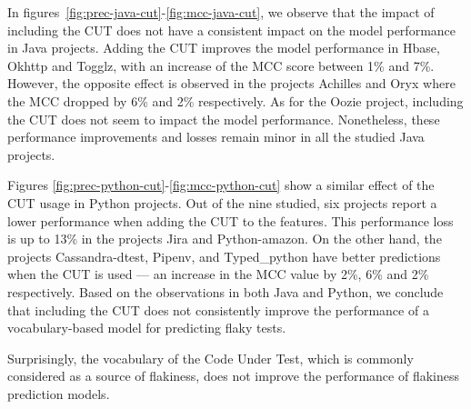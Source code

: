 In figures~\ref{fig:prec-java-cut}-\ref{fig:mcc-java-cut}, we observe that the impact of including the CUT does not have a consistent impact on the model performance in Java projects.
Adding the CUT improves the model performance in Hbase, Okhttp and Togglz, with an increase of the MCC score between 1\% and 7\%.
However, the opposite effect is observed in the projects Achilles and Oryx where the MCC dropped by 6\% and 2\% respectively.
As for the Oozie project, including the CUT does not seem to impact the model performance.
Nonetheless, these performance improvements and losses remain minor in all the studied Java projects.





Figures \ref{fig:prec-python-cut}-\ref{fig:mcc-python-cut} show a similar effect of the CUT usage in Python projects.
Out of the nine studied, six projects report a lower performance when adding the CUT to the features.
This performance loss is up to 13\% in the projects Jira and Python-amazon.
On the other hand, the projects Cassandra-dtest, Pipenv, and Typed\_python have better predictions when the CUT is used --- an increase in the MCC value by 2\%, 6\% and 2\% respectively.
Based on the observations in both Java and Python, we conclude that including the CUT does not consistently improve the performance of a vocabulary-based model for predicting flaky tests.

\begin{tcolorbox}
Surprisingly, the vocabulary of the Code Under Test, which is commonly considered as a source of flakiness, does not improve the performance of flakiness prediction models. 
\end{tcolorbox}

